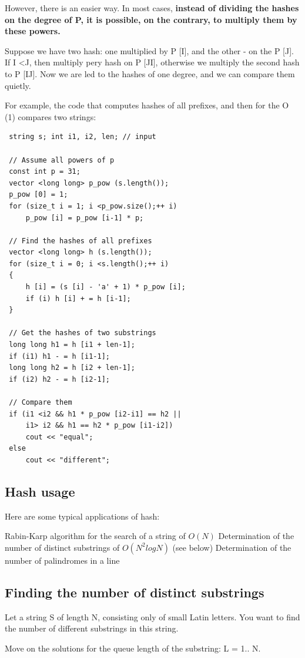 However, there is an easier way. In most cases, \textbf{instead of dividing the hashes on the degree of P, it is possible, on the contrary, to multiply them by these powers.}

Suppose we have two hash: one multiplied by P [I], and the other - on the P [J]. If I <J, then multiply pery hash on P [JI], otherwise we multiply the second hash to P [IJ]. Now we are led to the hashes of one degree, and we can compare them quietly.

For example, the code that computes hashes of all prefixes, and then for the O (1) compares two strings:
\begin{verbatim}
 string s; int i1, i2, len; // input

 // Assume all powers of p
 const int p = 31;
 vector <long long> p_pow (s.length());
 p_pow [0] = 1;
 for (size_t i = 1; i <p_pow.size();++ i)
     p_pow [i] = p_pow [i-1] * p;

 // Find the hashes of all prefixes
 vector <long long> h (s.length());
 for (size_t i = 0; i <s.length();++ i)
 {
     h [i] = (s [i] - 'a' + 1) * p_pow [i];
     if (i) h [i] + = h [i-1];
 }

 // Get the hashes of two substrings
 long long h1 = h [i1 + len-1];
 if (i1) h1 - = h [i1-1];
 long long h2 = h [i2 + len-1];
 if (i2) h2 - = h [i2-1];

 // Compare them
 if (i1 <i2 && h1 * p_pow [i2-i1] == h2 ||
     i1> i2 && h1 == h2 * p_pow [i1-i2])
     cout << "equal";
 else
     cout << "different"; 
\end{verbatim}

\subsection{ Hash usage }
Here are some typical applications of hash:

Rabin-Karp algorithm for the search of a string of $O (N)$
Determination of the number of distinct substrings of $O (N ^ 2 log N)$ (see below)
Determination of the number of palindromes in a line
\subsection{ Finding the number of distinct substrings }
Let a string S of length N, consisting only of small Latin letters. You want to find the number of different substrings in this string.

Move on the solutions for the queue length of the substring: L = 1.. N.

